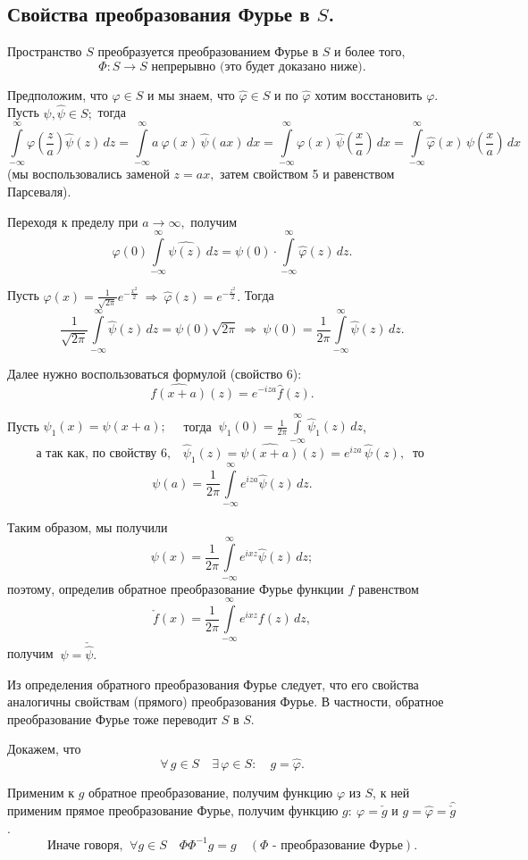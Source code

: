 \documentclass[a4paper]{article}
\newcommand{\ff} {\varphi}
\newcommand{\ir} {\int \limits_{-\infty}^{\infty}}
\newcommand{\w}{\widehat}
\newcommand{\wphi}{\widehat{\varphi}}
\newcommand{\fw}{\widehat{f}}
\begin{document}
\subsection{Свойства преобразования Фурье в $S$.}

Пространство $S$ преобразуется преобразованием Фурье в $S$ и более
того, $$\Phi : S \rightarrow S \mbox{ непрерывно (это будет
доказано ниже).}$$

Предположим, что $\varphi \in S$ и мы знаем, что $\wphi \in S$ и
по $\wphi$ хотим
восстановить $\varphi$.\\
Пусть $\psi, \widehat{\psi} \in S;$ тогда
$$
\ir \varphi\left(\frac{z}{a} \right) \widehat{\psi} (z) \, dz =
\ir a\  \varphi(x)\, \widehat{\psi} (ax) \, dx  = \ir \varphi(x)\,
\widehat{\psi} \left(\frac{x}{a}\right) \, dx = \ir \wphi(x)\,
\psi\left(\frac{x}{a}\right) \, dx
$$
(мы воспользовались заменой $z = ax,$ затем свойством 5 и
равенством Парсеваля).

Переходя к пределу при $a \rightarrow \infty,$ получим
$$\varphi(0) \ir \w{\psi(z)} \, dz = \psi(0) \cdot \ir
\wphi(z) \, dz.$$

Пусть $\varphi(x) = \frac{1}{\sqrt{2\pi}} e^{-\frac{x^2}{2}} \
\Rightarrow\  \wphi (z) = e^{-\frac{z^2}{2}}.$ Тогда
$$
\frac{1}{\sqrt{2 \pi}} \ir \widehat{\psi}(z) \, dz = \psi(0)
\sqrt{2\pi} \ \Longrightarrow\  \psi(0) = \frac{1}{2\pi} \ir
\widehat{\psi} (z) \, dz.
$$

Далее нужно воспользоваться формулой (свойство 6):
$$
\w{f(x+a)}(z) = e^{-iza} \fw(z).$$

Пусть $\psi_1(x) = \psi (x+a); \quad$ тогда $\ \psi_1(0) =
\frac{1}{2\pi} \ir \w{\psi}_1(z) \, dz$,
$$
\mbox{а так как, по свойству 6,}\quad \w{\psi}_1 (z) = \w{\psi
(x+a)} (z) = e^{iza} \, \w{\psi} (z), \ \mbox{ то }
$$
$$
\psi(a) = \frac{1}{2\pi} \ir e^{iza} \widehat{\psi}(z) \, dz.
$$

Таким образом, мы получили
$$
\psi(x) = \frac{1}{2\pi} \ir e^{ixz} \widehat{\psi}(z) \, dz;
$$
поэтому, определив обратное преобразование Фурье функции $f$
равенством
$$\check{f}(x) = \frac{1}{2\pi} \ir e^{ixz} f(z) \, dz,
$$
получим $\ \psi = \check{\w{\psi}}.$

Из определения обратного преобразования Фурье следует, что его
свойства аналогичны свойствам (прямого) преобразования Фурье. В
частности, обратное преобразование Фурье тоже переводит $S$ в $S$.

Докажем, что
$$
\forall \, g \in S \quad \exists \, \varphi \in S: \quad g =
\wphi.
$$

Применим к $g$ обратное преобразование, получим функцию $\ff$ из
$S$, к ней применим прямое преобразование Фурье, получим функцию
$g:\ \varphi = \check{g}$ и $g = \w{\ff} = \w{\check{g}}$.
$$
\mbox{Иначе говоря, } \ \forall g \in S \quad \Phi \Phi^{-1} g = g
\quad (\Phi\mbox{ - преобразование Фурье}).
$$
\end{document}
